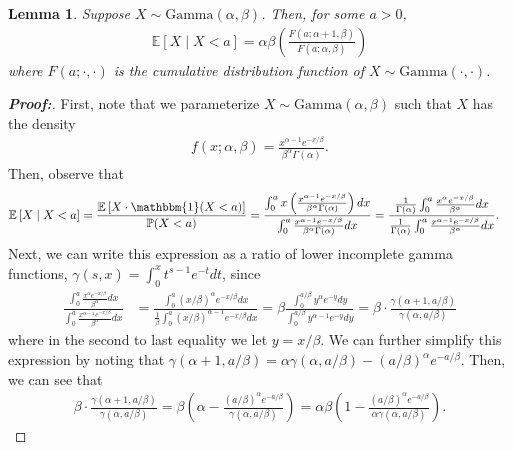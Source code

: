 \documentclass[10pt,a4paper]{amsart}
\newtheorem{lemma}{Lemma}
\begin{document}
\begin{lemma} \label{Gamma_cond_exp}
    Suppose $X \sim \text{Gamma}(\alpha, \beta)$. Then, for some $a > 0$,
    \begin{align*}
        \mathbb{E}\left[X \mid X < a \right] = \alpha \beta \left(\frac{F(a; \alpha + 1, \beta)}{F(a; \alpha, \beta)}\right)
    \end{align*}
    where $F(a; \cdot, \cdot)$ is the cumulative distribution function of $X \sim \text{Gamma}(\cdot, \cdot)$.
\end{lemma}

\begin{proof}[\textbf{Proof:}] First, note that we parameterize $X \sim \text{Gamma}(\alpha, \beta)$ such that $X$ has the density
\begin{align*}
    f(x; \alpha, \beta) = \frac{x^{\alpha - 1} e^{- x / \beta}}{\beta^\alpha \Gamma(\alpha)}.
\end{align*}
Then, observe that
\begin{align*}
    \mathbb{E}\left[X \mid X < a \right] &= \frac{\mathbb{E}\left[X \cdot \mathbbm{1}(X < a) \right]}{\mathbb{P}(X < a)} = \frac{\int^a_0 x \left( \frac{x^{\alpha - 1} e^{- x / \beta}}{\beta^\alpha \Gamma(\alpha)}  \right) dx}{\int^a_0 \frac{x^{\alpha - 1} e^{- x / \beta}}{\beta^\alpha \Gamma(\alpha)} dx} = \frac{\frac{1}{\Gamma(\alpha)}\int^a_0  \frac{x^{\alpha} e^{- x / \beta}}{\beta^\alpha }  dx}{\frac{1}{\Gamma(\alpha)}\int^a_0 \frac{x^{\alpha - 1} e^{- x / \beta}}{\beta^\alpha } dx}.
\end{align*}
Next, we can write this expression as a ratio of lower incomplete gamma functions, $\gamma(s, x) = \int^x_0 t^{s-1} e^{-t} dt$, since
\begin{align*}
  \frac{\int^a_0  \frac{x^{\alpha} e^{- x / \beta}}{\beta^\alpha }  dx}{\int^a_0 \frac{x^{\alpha - 1} e^{- x / \beta}}{\beta^\alpha } dx}  &=    \frac{\int^a_0 (x / \beta)^{\alpha} e^{- x / \beta}  dx}{\frac{1}{\beta}\int^a_0 (x / \beta)^{\alpha - 1} e^{- x / \beta} dx} = \beta \frac{\int^{a / \beta}_0 y^{\alpha} e^{- y}  dy}{\int^{a / \beta}_0 y^{\alpha - 1} e^{- y} dy} = \beta \cdot \frac{\gamma(\alpha + 1, a / \beta)}{\gamma(\alpha, a / \beta)}
\end{align*}
where in the second to last equality we let $y = x / \beta$. We can further simplify this expression by noting that $\gamma(\alpha + 1, a / \beta) = \alpha \gamma( \alpha, a / \beta) - (a / \beta)^\alpha e^{- a / \beta}$. Then, we can see that
\begin{align*}
    \beta \cdot \frac{\gamma(\alpha + 1, a / \beta)}{\gamma(\alpha, a / \beta)} = \beta \left(\alpha - \frac{(a / \beta)^\alpha e^{- a / \beta}}{\gamma(\alpha, a / \beta)}\right) = \alpha \beta \left(1 - \frac{(a / \beta)^\alpha e^{- a / \beta}}{\alpha \gamma(\alpha, a / \beta)}\right).

\end{align*}
\end{proof}
\end{document}
